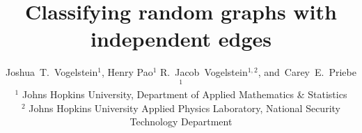  
\usepackage{url}


% 

\usepackage{array}
\usepackage{mdwmath}
\usepackage{mdwtab}

\usepackage{url}
\usepackage{amsfonts}



% 
% 
% 
% 
\newcommand{\hth}{\mh{\bth}}




\title{Classifying random graphs with independent edges}

\author{Joshua~T.~Vogelstein$^{1}$, %
		Henry Pao$^1$
        R.\ Jacob~Vogelstein$^{1,2}$, %
        and~Carey~E.~Priebe$^{1}$ %
\\
$^1$ Johns Hopkins University, Department of Applied Mathematics \& Statistics \\
$^2$ Johns Hopkins University Applied Physics Laboratory, National Security Technology Department 
}



